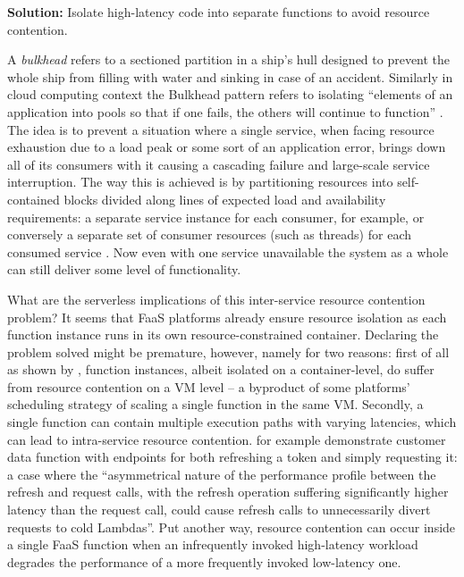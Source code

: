 \textbf{Solution:} Isolate high-latency code into separate functions to avoid resource contention.

A \textit{bulkhead} refers to a sectioned partition in a ship's hull designed to prevent the whole ship from filling with water and sinking in case of an accident. Similarly in cloud computing context the Bulkhead pattern refers to isolating ``elements of an application into pools so that if one fails, the others will continue to function'' \parencite{microsoft18cloudPatterns}. The idea is to prevent a situation where a single service, when facing resource exhaustion due to a load peak or some sort of an application error, brings down all of its consumers with it causing a cascading failure and large-scale service interruption. The way this is achieved is by partitioning resources into self-contained blocks divided along lines of expected load and availability requirements: a separate service instance for each consumer, for example, or conversely a separate set of consumer resources (such as threads) for each consumed service \parencite{nygard07releaseIt}. Now even with one service unavailable the system as a whole can still deliver some level of functionality.

What are the serverless implications of this inter-service resource contention problem? It seems that FaaS platforms already ensure resource isolation as each function instance runs in its own resource-constrained container. Declaring the problem solved might be premature, however, namely for two reasons: first of all as shown by \textcite{wang18peekingbehindcurtains}, function instances, albeit isolated on a container-level, do suffer from resource contention on a VM level -- a byproduct of some platforms' scheduling strategy of scaling a single function in the same VM. Secondly, a single function can contain multiple execution paths with varying latencies, which can lead to intra-service resource contention. \textcite{bardsley18optimizationStrategies} for example demonstrate customer data function with endpoints for both refreshing a token and simply requesting it: a case
where the ``asymmetrical nature of the performance profile between the refresh and request calls, with the refresh operation suffering significantly higher latency than the request call, could cause refresh calls to unnecessarily divert requests to cold Lambdas''. Put another way, resource contention can occur inside a single FaaS function when an infrequently invoked high-latency workload degrades the performance of a more frequently invoked low-latency one.

